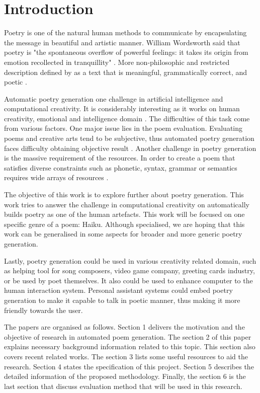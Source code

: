 \section{Introduction}



Poetry is one of the natural human methods to communicate by encapsulating the message in beautiful and artistic manner. William Wordsworth said that poetry is "the spontaneous overflow of powerful feelings: it takes its origin from emotion recollected in tranquillity" \cite{wordsworth1990preface}. More non-philosophic and restricted description defined by \citeauthor{manurung2004evolutionary} as a text that is meaningful, grammatically correct, and poetic \cite{manurung2004evolutionary}.


Automatic poetry generation one challenge in artificial intelligence and computational creativity. It is considerably interesting as it works on human creativity, emotional and intelligence domain \cite{colton2012computational}. The difficulties of this task come from various factors. One major issue lies in the poem evaluation. Evaluating poems and creative arts tend to be subjective, thus automated poetry generation faces difficulty obtaining objective result \cite{binsted1996machine}. Another challenge in poetry generation is the massive requirement of the resources. In order to create a poem that satisfies diverse constraints such as phonetic, syntax, grammar or semantics requires wide arrays of resources \cite{manurung2000towards}. 


The objective of this work is to explore further about poetry generation. This work tries to answer the challenge in computational creativity on automatically builds poetry as one of the human artefacts. This work will be focused on one specific genre of a poem: Haiku. Although specialised, we are hoping that this work can be generalised in some aspects for broader and more generic poetry generation. 


Lastly, poetry generation could be used in various creativity related domain, such as helping tool for song composers, video game company, greeting cards industry, or be used by poet themselves. It also could be used to enhance computer to the human interaction system. Personal assistant systems could embed poetry generation to make it capable to talk in poetic manner, thus making it more friendly towards the user. 


The papers are organised as follows. Section 1 delivers the motivation and the objective of research in automated poem generation. The section 2 of this paper explains necessary background information related to this topic. This section also covers recent related works. The section 3 lists some useful resources to aid the research. Section 4 states the specification of this project. Section 5 describes the detailed information of the proposed methodology. Finally, the section 6 is the last section that discuss evaluation method that will be used in this research.

